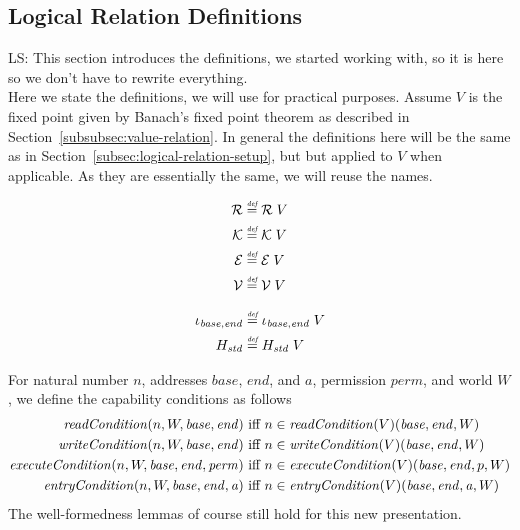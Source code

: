 \documentclass[a4paper]{article}
\newcommand{\defeq}{\stackrel{\textit{\tiny{def}}}{=}}
\newcommand\lau[1]{{\color{purple} \sf \footnotesize {LS: #1}}\\}
\newcommand{\var}[1]{\mathit{#1}}
\newcommand{\addr}{\var{a}}
\newcommand{\start}{\var{base}}
\newcommand{\addrend}{\var{end}}
\newcommand{\perm}{\var{perm}}
\newcommand{\plainfun}[2]{
  \ifthenelse{\equal{#2}{}}
             {\mathit{#1}}
             {\mathit{#1}(#2)}
}
\newcommand{\readCond}[1]{\plainfun{readCondition}{#1}}
\newcommand{\writeCond}[1]{\plainfun{writeCondition}{#1}}
\newcommand{\execCond}[1]{\plainfun{executeCondition}{#1}}
\newcommand{\entryCond}[1]{\plainfun{entryCondition}{#1}}
\newcommand{\asmType}{\plaindom{AsmType}}
\newcommand{\plaindom}[1]{\mathrm{#1}}
\newcommand{\intr}[2]{\mathcal{#1}}
\newcommand{\valueintr}[1]{\intr{V}{#1}}
\newcommand{\exprintr}[1]{\intr{E}{#1}}
\newcommand{\contintr}[1]{\intr{K}{#1}}
\newcommand{\regintr}[1]{\intr{R}{#1}}
\newcommand{\stdvr}{\valueintr{\asmType}}
\newcommand{\stder}{\exprintr{\asmType}}
\newcommand{\stdrr}{\regintr{\asmType}}
\newcommand{\stdkr}{\contintr{\asmType}}
\begin{document}
\subsection{Logical Relation Definitions}
\label{subsec:logical-relation-definitions}
\lau{This section introduces the definitions, we started working with, so it is here so we don't have to rewrite everything.}
Here we state the definitions, we will use for practical purposes.  Assume $V$ is the fixed point given by Banach's fixed point theorem as described in Section~\ref{subsubsec:value-relation}. In general the definitions here will be the same as in Section~\ref{subsec:logical-relation-setup}, but but applied to $V$ when applicable. As they are essentially the same, we will reuse the names.

\begin{align*}
  \stdrr & \defeq \stdrr \; V \\
  \stdkr & \defeq \stdkr \; V \\
  \stder & \defeq \stder \; V \\
  \stdvr & \defeq \stdvr \; V 
\end{align*}

\begin{align*}
  \iota_{\start,\addrend} & \defeq \iota_{\start,\addrend} \; V \\
  H_{\var{std}}          & \defeq H_{\var{std}} \; V
\end{align*}

For natural number $n$, addresses $\start$, $\addrend$, and $\addr$, permission $\perm$, and world $W$, we define the capability conditions as follows
\begin{align*}
  \readCond{n,W,\start,\addrend}        & \text{ iff } n \in \readCond{}(V)(\start,\addrend,W)\\
  \writeCond{n,W,\start,\addrend}       & \text{ iff } n \in \writeCond{}(V)(\start,\addrend,W)\\
  \execCond{n,W,\start,\addrend,\perm}  & \text{ iff } n \in \execCond{}(V)(\start,\addrend,p,W)\\
  \entryCond{n,W,\start,\addrend,\addr} & \text{ iff } n \in \entryCond{}(V)(\start,\addrend,\addr,W)
\end{align*}
The well-formedness lemmas of course still hold for this new presentation.
\end{document}
